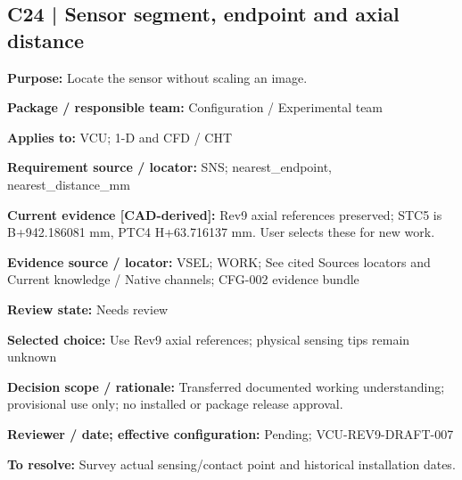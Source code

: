 \documentclass[11pt]{article}
\begin{document}
\par\noindent\begin{minipage}{\textwidth}\small\setlength{\parskip}{2pt}
\subsection*{C24 | Sensor segment, endpoint and axial distance}
\textbf{Purpose:} Locate the sensor without scaling an image.\par
\textbf{Package / responsible team:} Configuration / Experimental team\par
\textbf{Applies to:} VCU; 1-D and CFD / CHT\par
\textbf{Requirement source / locator:} SNS; nearest\_\allowbreak{}endpoint, nearest\_\allowbreak{}distance\_\allowbreak{}mm\par
\textbf{Current evidence [CAD-derived]:} Rev9 axial references preserved; STC5 is B+942.186081 mm, PTC4 H+63.716137 mm. User selects these for new work.\par
\textbf{Evidence source / locator:} VSEL; WORK; See cited Sources locators and Current knowledge / Native channels; CFG-002 evidence bundle\par
\textbf{Review state:} Needs review\par
\textbf{Selected choice:} Use Rev9 axial references; physical sensing tips remain unknown\par
\textbf{Decision scope / rationale:} Transferred documented working understanding; provisional use only; no installed or package release approval.\par
\textbf{Reviewer / date; effective configuration:} Pending; VCU-REV9-DRAFT-007\par
\textbf{To resolve:} Survey actual sensing/contact point and historical installation dates.\par
\end{minipage}\par\vspace{5pt}
\end{document}
